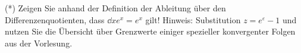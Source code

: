 \item (*) Zeigen Sie anhand der Definition der Ableitung über den Differenzenquotienten, dass $\dd{}{x} e^x = e^x$ gilt! Hinweis: Substitution $z=e^\varepsilon-1$ und nutzen Sie die Übersicht über Grenzwerte einiger spezieller konvergenter Folgen aus der Vorlesung.

